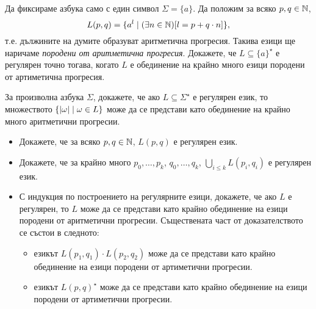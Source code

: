 \begin{problem}
  Да фиксираме азбука само с един символ $\Sigma = \{a\}$.
  Да положим за всяко $p,q\in\mathbb{N}$, 
  \[L(p,q) = \{a^l \mid (\exists n\in\mathbb{N})[l = p+q\cdot n]\},\]
  т.е. дължините на думите образуват аритметична прогресия.
  Такива езици ще наричаме {\em породени от аритметична прогресия}.
  Докажете, че $L \subseteq \{a\}^\star$ е регулярен точно тогава, когато $L$
  е обединение на крайно много езици породени от артиметична прогресия.
  
  За произволна азбука $\Sigma$, докажете, че ако $L \subseteq \Sigma^\star$ е регулярен език, 
  то множеството $\{\lvert{\omega}\rvert\mid \omega \in L\}$ може да се представи като обединение 
  на крайно много аритметични прогресии.
\end{problem}
\begin{hint}
  \begin{itemize}
  \item 
    Докажете, че за всяко $p,q \in \mathbb{N}$, $L(p,q)$ е регулярен език.
  \item
    Докажете, че за крайно много $p_0,\dots,p_k$, $q_0,\dots,q_k$,
    $\bigcup_{i \leq k}L(p_i,q_i)$ е регулярен език.
  \item
    С индукция по построението на регулярните езици, 
    докажете, че ако $L$ е регулярен, то $L$ може да се представи
    като крайно обединение на езици породени от аритметични прогресии.
    Съществената част от доказателството се състои в следното:
    \begin{itemize}
    \item 
      езикът $L(p_1,q_1) \cdot L(p_2,q_2)$ може да се представи като крайно обединение 
      на езици породени от артиметични прогресии.
    \item
      езикът $L(p,q)^\star$ може да се представи като крайно обединение 
      на езици породени от артиметични прогресии.
    \end{itemize}
  \end{itemize}
\end{hint}

